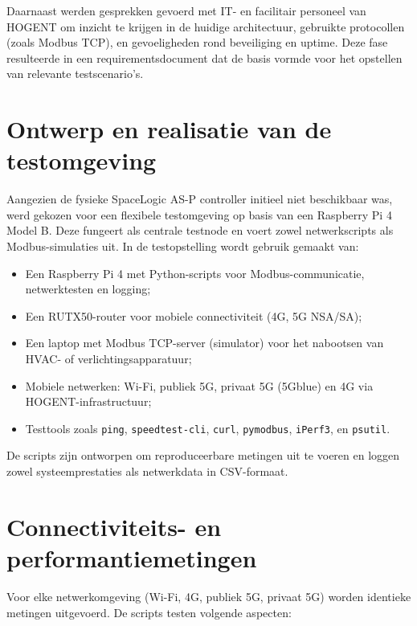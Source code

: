 Daarnaast werden gesprekken gevoerd met IT- en facilitair personeel van HOGENT om inzicht te krijgen in de huidige architectuur, gebruikte protocollen (zoals Modbus TCP), en gevoeligheden rond beveiliging en uptime. Deze fase resulteerde in een requirementsdocument dat de basis vormde voor het opstellen van relevante testscenario’s.

\section{Ontwerp en realisatie van de testomgeving}

Aangezien de fysieke SpaceLogic AS-P controller initieel niet beschikbaar was, werd gekozen voor een flexibele testomgeving op basis van een Raspberry Pi 4 Model B. Deze fungeert als centrale testnode en voert zowel netwerkscripts als Modbus-simulaties uit. In de testopstelling wordt gebruik gemaakt van:

\begin{itemize}
    \item Een Raspberry Pi 4 met Python-scripts voor Modbus-communicatie, netwerktesten en logging;
    \item Een RUTX50-router voor mobiele connectiviteit (4G, 5G NSA/SA);
    \item Een laptop met Modbus TCP-server (simulator) voor het nabootsen van HVAC- of verlichtingsapparatuur;
    \item Mobiele netwerken: Wi-Fi, publiek 5G, privaat 5G (5Gblue) en 4G via HOGENT-infrastructuur;
    \item Testtools zoals \texttt{ping}, \texttt{speedtest-cli}, \texttt{curl}, \texttt{pymodbus}, \texttt{iPerf3}, en \texttt{psutil}.
\end{itemize}

De scripts zijn ontworpen om reproduceerbare metingen uit te voeren en loggen zowel systeemprestaties als netwerkdata in CSV-formaat.

\section{Connectiviteits- en performantiemetingen}

Voor elke netwerkomgeving (Wi-Fi, 4G, publiek 5G, privaat 5G) worden identieke metingen uitgevoerd. De scripts testen volgende aspecten:


